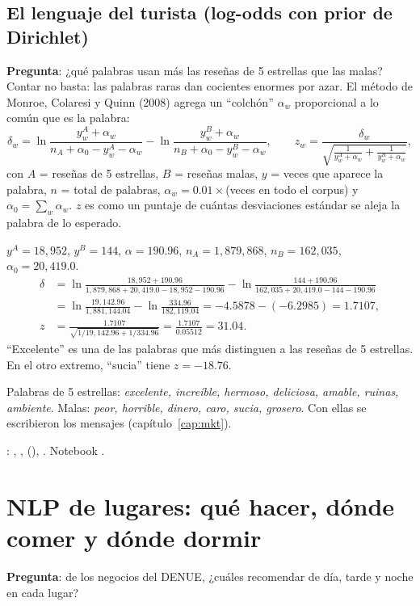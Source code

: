 \subsection{El lenguaje del turista (log-odds con prior de Dirichlet)}
\textbf{Pregunta}: ¿qué palabras usan más las reseñas de 5 estrellas que las malas? Contar no basta: las palabras raras dan
cocientes enormes por azar. El método de Monroe, Colaresi y Quinn (2008) agrega un ``colchón'' $\alpha_w$ proporcional a lo
común que es la palabra:
\[
\delta_w=\ln\frac{y^A_w+\alpha_w}{n_A+\alpha_0-y^A_w-\alpha_w}-\ln\frac{y^B_w+\alpha_w}{n_B+\alpha_0-y^B_w-\alpha_w},
\qquad z_w=\frac{\delta_w}{\sqrt{\frac{1}{y^A_w+\alpha_w}+\frac{1}{y^B_w+\alpha_w}}} ,
\]
con $A$ = reseñas de 5 estrellas, $B$ = reseñas malas, $y$ = veces que aparece la palabra, $n$ = total de palabras,
$\alpha_w=0.01\times$(veces en todo el corpus) y $\alpha_0=\sum_w\alpha_w$. $z$ es como un puntaje de cuántas
desviaciones estándar se aleja la palabra de lo esperado.

\begin{amano}
$y^A=18{,}952$, $y^B=144$, $\alpha=190.96$, $n_A=1{,}879{,}868$, $n_B=162{,}035$, $\alpha_0=20{,}419.0$.
\begin{align*}
\delta&=\ln\frac{18{,}952+190.96}{1{,}879{,}868+20{,}419.0-18{,}952-190.96}-\ln\frac{144+190.96}{162{,}035+20{,}419.0-144-190.96}\\
&=\ln\frac{19{,}142.96}{1{,}881{,}144.04}-\ln\frac{334.96}{182{,}119.04}=-4.5878-(-6.2985)=1.7107,\\
z&=\frac{1.7107}{\sqrt{1/19{,}142.96+1/334.96}}=\frac{1.7107}{0.05512}=31.04 .
\end{align*}
``Excelente'' es una de las palabras que más distinguen a las reseñas de 5 estrellas. En el otro extremo, ``sucia'' tiene
$z=-18.76$.
\end{amano}

Palabras de 5 estrellas: \emph{excelente, increíble, hermoso, deliciosa, amable, ruinas, ambiente}. Malas: \emph{peor,
horrible, dinero, caro, sucia, grosero}. Con ellas se escribieron los mensajes (capítulo~\ref{cap:mkt}).

\begin{codigoen}: , , 
(), . Notebook .\end{codigoen}

\section{NLP de lugares: qué hacer, dónde comer y dónde dormir}
\textbf{Pregunta}: de los negocios del DENUE, ¿cuáles recomendar de día, tarde y noche en cada lugar?

